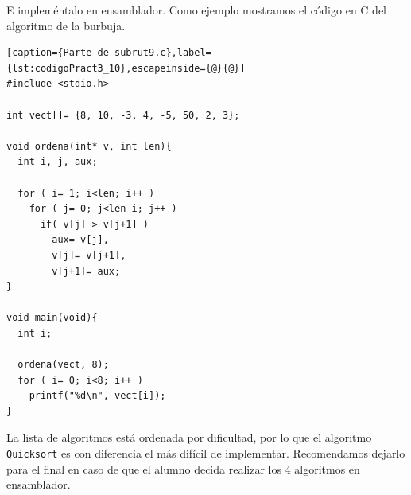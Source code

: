 E impleméntalo en ensamblador. Como ejemplo mostramos el código en C
del algoritmo de la burbuja.

\begin{lstlisting}[caption={Parte de subrut9.c},label={lst:codigoPract3_10},escapeinside={@}{@}]
#include <stdio.h>

int vect[]= {8, 10, -3, 4, -5, 50, 2, 3};

void ordena(int* v, int len){
  int i, j, aux;

  for ( i= 1; i<len; i++ )
    for ( j= 0; j<len-i; j++ )
      if( v[j] > v[j+1] )
        aux= v[j],
        v[j]= v[j+1],
        v[j+1]= aux;
}

void main(void){
  int i;

  ordena(vect, 8);
  for ( i= 0; i<8; i++ )
    printf("%d\n", vect[i]);
}
\end{lstlisting}

La lista de algoritmos está ordenada por dificultad, por lo que el algoritmo
{\tt Quicksort} es con diferencia el más difícil de implementar. Recomendamos
dejarlo para el final en caso de que el alumno decida realizar los 4 algoritmos
en ensamblador.

\chapterend{}

